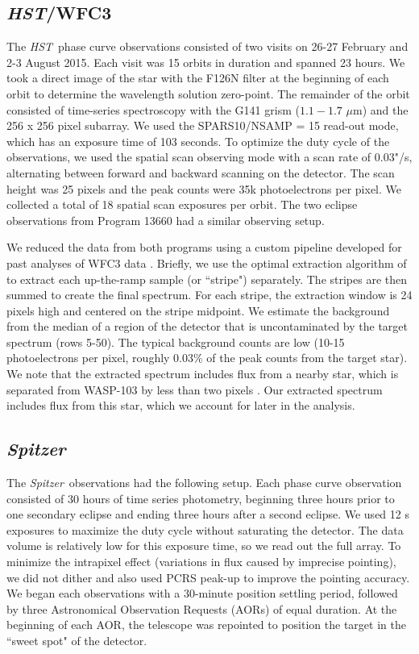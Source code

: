 \documentclass[twocolumn]{aastex61}
\newcommand{\project}[1]{\textsl{#1}}
\newcommand{\HST}{\project{HST}}
\newcommand{\Spitzer}{\project{Spitzer}}
\begin{document}
\subsection{\HST/WFC3}
The \HST\ phase curve observations consisted of two visits on 26-27 February and 2-3 August 2015. Each visit was 15 orbits in duration and spanned 23 hours. We took a direct image of the star with the F126N filter at the beginning of each orbit to determine the wavelength solution zero-point. The remainder of the orbit consisted of time-series spectroscopy with the G141 grism ($1.1 - 1.7$ $\mu$m) and the 256 x 256 pixel subarray. We used the SPARS10/NSAMP = 15 read-out mode, which has an exposure time of 103 seconds. To optimize the duty cycle of the observations, we used the spatial scan observing mode with a scan rate of 0.03"/s, alternating between forward and backward scanning on the detector. The scan height was 25 pixels and the peak counts were 35k photoelectrons per pixel. We collected a total of 18 spatial scan exposures per orbit.  The two eclipse observations from Program 13660 had a similar observing setup.  

We reduced the data from both programs using a custom pipeline developed for past analyses of WFC3 data \citep[for details see][]{kreidberg14a, kreidberg14b, kreidberg15b}. Briefly, we use the optimal extraction algorithm of \cite{horne86} to extract each up-the-ramp sample (or ``stripe") separately. The stripes are then summed to create the final spectrum. For each stripe, the extraction window is 24 pixels high and centered on the stripe midpoint. We estimate the background from the median of a region of the detector that is uncontaminated by the target spectrum (rows 5-50). The typical background counts are low (10-15 photoelectrons per pixel, roughly 0.03\% of the peak counts from the target star). We note that the extracted spectrum includes flux from a nearby star, which is separated from WASP-103 by less than two pixels \citep[0.2";][]{wollert15}. Our extracted spectrum includes flux from this star, which we account for later in the analysis. 

\subsection{\Spitzer}
The \Spitzer\ observations had the following setup. Each phase curve observation consisted of 30 hours of time series photometry, beginning three hours prior to one secondary eclipse and ending three hours after a second eclipse.  We used 12 s exposures to maximize the duty cycle without saturating the detector. The data volume is relatively low for this exposure time, so we read out the full array. To minimize the intrapixel effect (variations in flux caused by imprecise pointing), we did not dither and also used PCRS peak-up to improve the pointing accuracy. We began each observations with a 30-minute position settling period, followed by three Astronomical Observation Requests (AORs) of equal duration. At the beginning of each AOR, the telescope was repointed to position the target in the ``sweet spot" of the detector.
\end{document}
